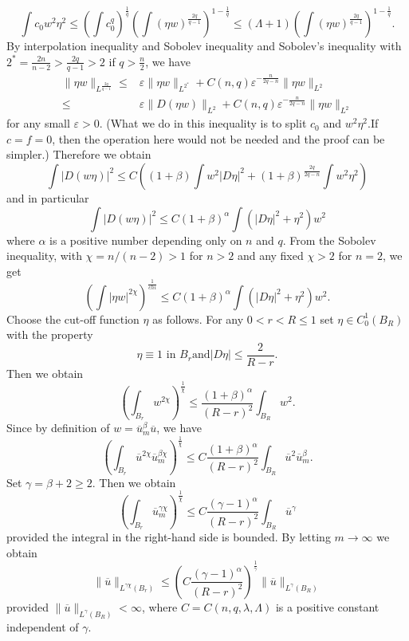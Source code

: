  \[
   \int c_0 w^2\eta^2\le \left( \int c_0^{q} \right) ^{\frac{1}{q}}\left( \int \left( \eta w \right) ^{\frac{2q}{q-1}} \right) ^{1-\frac{1}{q}}\le \left( \Lambda+1 \right) \left( \int (\eta w)^{\frac{2q}{q-1}} \right) ^{1-\frac{1}{q}}.
 \] 
 By interpolation inequality and  Sobolev inequality and Sobolev's inequality with $2^{\ast}=\frac{2n}{n-2}>\frac{2q}{q-1}>2$ if $q>\frac{n}{2}$, we have
 \begin{align*}
   \|\eta w\|_{L^{\frac{2q}{q-1}}}\le & \varepsilon  \|\eta w\|_{L^{2^{\ast}}}+C(n,q)\varepsilon ^{-\frac{n}{2q-n}}\|\eta w\|_{L^2}\\
   \le &\varepsilon  \|D(\eta w)\|_{L^2}+C(n,q)\varepsilon ^{-\frac{n}{2q-n}}\|\eta w\|_{L^2}
 \end{align*}
 for any small $\varepsilon >0$. (What we do in this inequality is to split $c_0$ and $w^2\eta^2$.If $c=f=0$, then the operation here would not be needed and the proof can be simpler.)
 Therefore we obtain
 \[
   \int \left| D(w\eta) \right| ^2\le C\left( (1+\beta)\int w^2\left| D\eta \right| ^2+(1+\beta)^{\frac{2q}{2q-n}}\int w^2\eta^2 \right) 
 \] 
 and in particular
 \[
   \int \left| D(w\eta) \right| ^2\le C(1+\beta)^{\alpha}\int \left( \left| D\eta \right| ^2+\eta^2 \right) w^2
 \] 
 where $\alpha$ is a positive number depending only on $n$ and $q$. 
 From the Sobolev inequality, with $\chi=n\slash(n-2)>1$ for  $n>2$ and any fixed  $\chi >2$ for $n=2$, we get
 \[
   \left( \int\left| \eta w \right| ^{2\chi} \right) ^{\frac{1}{chi}}\le C(1+\beta)^{\alpha}\int \left( \left| D \eta \right| ^2+\eta^2 \right) w^2.
 \] 
 Choose the cut-off function $\eta$ as follows. For any $0<r<R\le 1$ set $\eta \in C_0^{1}(B_R)$ with the property
 \[
 \eta\equiv 1 \text{ in }B_r \text{and} \left| D\eta \right| \le \frac{2}{R-r}.
 \] 
 Then we obtain 
 \[
   \left( \int_{B_r}w^{2\chi} \right) ^{\frac{1}{\chi}}\le \frac{(1+\beta)^{\alpha}}{(R-r)^2}\int_{B_R}w^2.
 \] 
 Since by definition of $w=\overline{u}_m^{\beta}\overline{u} $, we have
 \[
   \left( \int_{B_r}\overline{u}^{2\chi}\overline{u}_m^{\beta\chi} \right) ^{\frac{1}{\chi}}\le C \frac{(1+\beta)^{\alpha}}{(R-r)^2}\int_{B_R}\overline{u}^2\overline{u}_m^{\beta}.
 \] 
 Set $\gamma=\beta+2\ge 2$. Then we obtain
 \[
   \left( \int_{B_r}\overline{u}_m^{\gamma\chi} \right) ^{\frac{1}{\chi}}\le C \frac{(\gamma-1)^{\alpha}}{(R-r)^2}\int_{B_R}\overline{u}^{\gamma}
 \] 
 provided the integral in the right-hand side is bounded. By letting $m\to \infty$ we obtain
 \[
   \|\overline{u}\|_{L^{\gamma\chi}(B_r)}\le \left( C \frac{(\gamma-1)^{\alpha}}{(R-r)^{2}} \right) ^{\frac{1}{\gamma}}\|\overline{u}\|_{L^{\gamma}(B_R)}
 \] provided $\|\overline{u}\|_{L^{\gamma}(B_R)}<\infty$, where $C=C(n,q,\lambda,\Lambda)$ is a positive constant independent of $\gamma$. 

